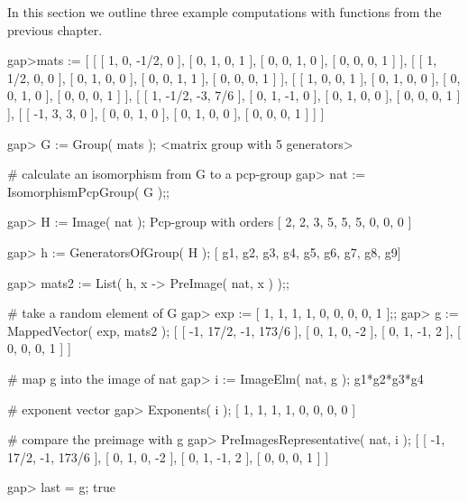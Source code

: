 
In this section we outline three example computations with functions
from the previous chapter. 


\beginexample
gap>mats := 
[ [ [ 1, 0, -1/2, 0 ], [ 0, 1, 0, 1 ], [ 0, 0, 1, 0 ], [ 0, 0, 0, 1 ] ],
  [ [ 1, 1/2, 0, 0 ], [ 0, 1, 0, 0 ], [ 0, 0, 1, 1 ], [ 0, 0, 0, 1 ] ],
  [ [ 1, 0, 0, 1 ], [ 0, 1, 0, 0 ], [ 0, 0, 1, 0 ], [ 0, 0, 0, 1 ] ],
  [ [ 1, -1/2, -3, 7/6 ], [ 0, 1, -1, 0 ], [ 0, 1, 0, 0 ], [ 0, 0, 0, 1 ] ],
  [ [ -1, 3, 3, 0 ], [ 0, 0, 1, 0 ], [ 0, 1, 0, 0 ], [ 0, 0, 0, 1 ] ] ]

gap> G := Group( mats );
<matrix group with 5 generators>

# calculate an isomorphism from G to a pcp-group
gap> nat := IsomorphismPcpGroup( G );;   
     
gap> H := Image( nat );
Pcp-group with orders [ 2, 2, 3, 5, 5, 5, 0, 0, 0 ]

gap> h := GeneratorsOfGroup( H );
[ g1, g2, g3, g4, g5, g6, g7, g8, g9]

gap> mats2 := List( h, x -> PreImage( nat, x ) );;

# take a random element of G
gap> exp :=  [ 1, 1, 1, 1, 0, 0, 0, 0, 1 ];;
gap> g := MappedVector( exp, mats2 );
[ [ -1, 17/2, -1, 173/6 ], 
  [ 0, 1, 0, -2 ], 
  [ 0, 1, -1, 2 ], 
  [ 0, 0,  0, 1 ] ]

# map g into the image of nat
gap> i := ImageElm( nat, g );
g1*g2*g3*g4

# exponent vector 
gap> Exponents( i );
[ 1, 1, 1, 1, 0, 0, 0, 0 ]

# compare the preimage with g
gap> PreImagesRepresentative( nat, i );
[ [ -1, 17/2, -1, 173/6 ], 
  [ 0, 1, 0, -2 ], 
  [ 0, 1, -1, 2 ], 
  [ 0, 0, 0, 1 ] ]

gap> last = g;
true

\endexample


